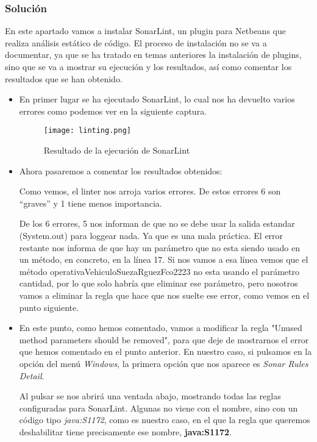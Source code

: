 \subsubsection{Solución}
En este apartado vamos a instalar SonarLint, un plugin para Netbeans que realiza análisis estático de código. El proceso de instalación no se va a documentar, ya que se ha tratado en temas anteriores la instalación de plugins, sino que se va a mostrar su ejecución y los resultados, así como comentar los resultados que se han obtenido.

\begin{itemize}
    \item En primer lugar se ha ejecutado SonarLint, lo cual nos ha devuelto varios errores como podemos ver en la siguiente captura.

    \begin{figure}[H]
        \centering
        \texttt{[image: linting.png]}
        \caption{Resultado de la ejecución de SonarLint}
    \end{figure}

    \item Ahora pasaremos a comentar los resultados obtenidos:

    Como vemos, el linter nos arroja varios errores. De estos errores 6 son ``graves'' y 1 tiene menos importancia.

    De los 6 errores, 5 nos informan de que no se debe usar la salida estandar (System.out) para loggear nada. Ya que es una mala práctica. El error restante nos informa de que hay un parámetro que no esta siendo usado en un método, en concreto, en la línea 17. Si nos vamos a esa línea vemos que el método operativaVehiculoSuezaRguezFco2223 no esta usando el parámetro cantidad, por lo que solo habría que eliminar ese parámetro, pero nosotros vamos a eliminar la regla que hace que nos suelte ese error, como vemos en el punto siguiente.

    \item En este punto, como hemos comentado, vamos a modificar la regla "Unused method parameters should be removed", para que deje de mostrarnos el error que hemos comentado en el punto anterior. En nuestro caso, si pulsamos en la opción del menú \textit{Windows}, la primera opción que nos aparece es \textit{Sonar Rules Detail}.

    Al pulsar se nos abrirá una ventada abajo, mostrando todas las reglas configuradas para SonarLint. Algunas no viene con el nombre, sino con un código tipo \textit{java:S1172}, como es nuestro caso, en el que la regla que queremos deshabilitar tiene precisamente ese nombre, \textbf{java:S1172}.


\end{itemize}
